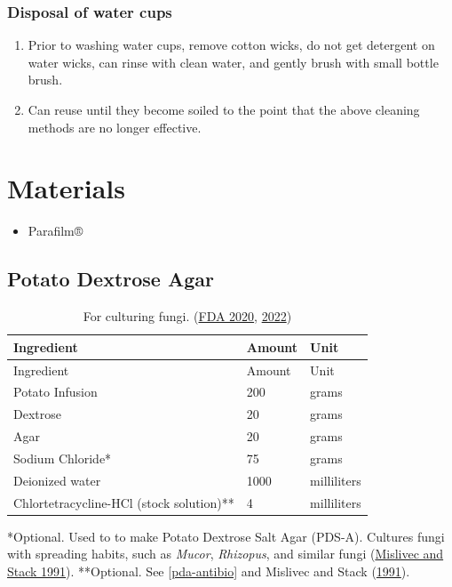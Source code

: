 \documentclass{sop_class}[overrideChapters] %
\providecommand{\tightlist}{%
  \setlength{\itemsep}{0pt}\setlength{\parskip}{0pt}}
\begin{document}
{{\subsubsection{Disposal of water cups}\label{dispose-water}}
\begin{enumerate}
\def\labelenumi{\arabic{enumi}.}
\item
  Prior to washing water cups, remove cotton wicks, do not get
  detergent on water wicks, can rinse with clean water, and gently
  brush with small bottle brush.
\item
  Can reuse until they become soiled to the point that the above
  cleaning methods are no longer effective.
\end{enumerate}
\hypertarget{materials-6}{%
\section{Materials}\label{materials-6}}
\begin{itemize}
\tightlist
\item
  Parafilm®
\end{itemize}
\hypertarget{potato-dextrose-agar}{%
\subsection{Potato Dextrose Agar}\label{potato-dextrose-agar}}
\begin{longtable}[]{@{}lll@{}}
\caption{For culturing fungi. (\protect\hyperlink{ref-FDA2020}{FDA 2020}, \protect\hyperlink{ref-FDA2022}{2022})}\tabularnewline
\toprule()
Ingredient & Amount & Unit \\
\midrule()
\endfirsthead
\toprule()
Ingredient & Amount & Unit \\
\midrule()
\endhead
Potato Infusion & 200 & grams \\
Dextrose & 20 & grams \\
Agar & 20 & grams \\
Sodium Chloride* & 75 & grams \\
Deionized water & 1000 & milliliters \\
Chlortetracycline-HCl (stock solution)** & 4 & milliliters \\
\bottomrule()
\end{longtable}
*Optional. Used to to make Potato Dextrose Salt Agar (PDS-A). Cultures
fungi with spreading habits, such as \emph{Mucor}, \emph{Rhizopus}, and similar
fungi (\protect\hyperlink{ref-Mislivec1991}{Mislivec and Stack 1991}). **Optional. See \ref{pda-antibio} and
Mislivec and Stack (\protect\hyperlink{ref-Mislivec1991}{1991}).

}
\end{document}
